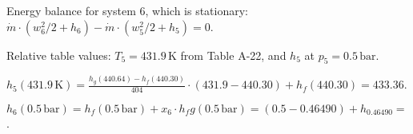 Energy balance for system 6, which is stationary:  
\( \dot{m} \cdot \left( w_6^2 / 2 + h_6 \right) - \dot{m} \cdot \left( w_5^2 / 2 + h_5 \right) = 0 \).  

Relative table values:  
\( T_5 = 431.9 \, \text{K} \) from Table A-22, and \( h_5 \) at \( p_5 = 0.5 \, \text{bar} \).  

\( h_5 (431.9 \, \text{K}) = \frac{h_g (440.64) - h_f (440.30)}{404} \cdot (431.9 - 440.30) + h_f (440.30) = 433.36 \).  

\( h_6 (0.5 \, \text{bar}) = h_f (0.5 \, \text{bar}) + x_6 \cdot h_fg (0.5 \, \text{bar}) = \left( 0.5 - 0.46490 \right) + h_0.46490 = \).